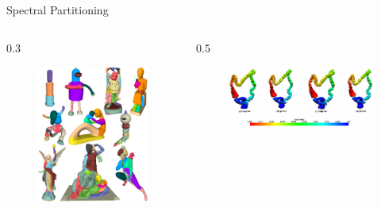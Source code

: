 \documentclass{beamer}
\begin{document}
\begin{frame}{Spectral Partitioning}
    \begin{columns}
        \begin{column}{0.3\pagewidth}
            \begin{figure}
                \centering
                \includegraphics[width=\textwidth]{spectral_partitioning.png}
            \end{figure}
        \end{column}
        \begin{column}{0.5\pagewidth}
            \begin{figure}
                \centering
                \includegraphics[width=\textwidth]{fielder_vector_colon.png}
            \end{figure}
        \end{column}
    \end{columns}
\end{frame}
    
\end{document}
